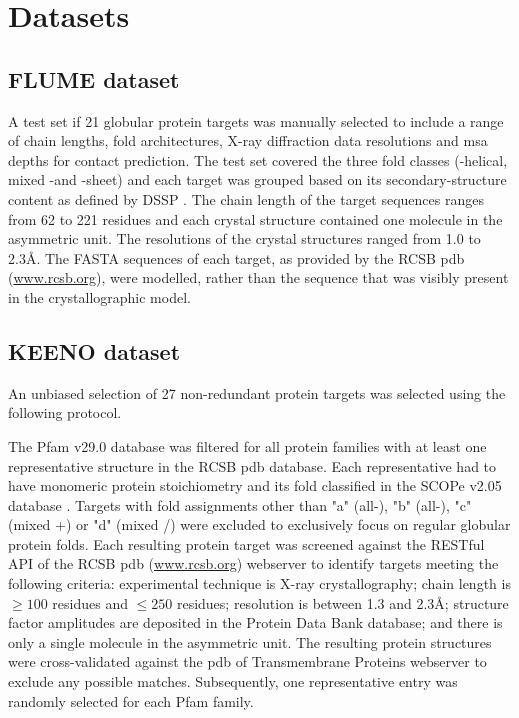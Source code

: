 
\section{Datasets}
\subsection{FLUME dataset}
A test set if 21 globular protein targets was manually selected to include a range of chain lengths, fold architectures, X-ray diffraction data resolutions and \gls{msa} depths for contact prediction. The test set covered the three fold classes (\textalpha-helical, mixed \textalpha-\textbeta and \textbeta-sheet) and each target was grouped based on its secondary-structure content as defined by DSSP \cite{Kabsch1983-dy}. The chain length of the target sequences ranges from 62 to 221 residues and each crystal structure contained one molecule in the asymmetric unit. The resolutions of the crystal structures ranged from 1.0 to 2.3\AA. The FASTA sequences of each target, as provided by the RCSB \gls{pdb} (\url{www.rcsb.org}), were modelled, rather than the sequence that was visibly present in the crystallographic model. 

\subsection{KEENO dataset} \label{sec:methods_keeno_dataset}
An unbiased selection of 27 non-redundant protein targets was selected using the following protocol.

The Pfam v29.0 \cite{Finn2016-tz} database was filtered for all protein families with at least one representative structure in the RCSB \gls{pdb} \cite{Berman2000-qj} database. Each representative had to have monomeric protein stoichiometry and its fold classified in the SCOPe v2.05 database \cite{Chandonia2017-bd}. Targets with fold assignments other than "a" (all-\textalpha), "b" (all-\textbeta), "c" (mixed \textalpha+\textbeta) or "d" (mixed \textalpha/\textbeta) were excluded to exclusively focus on regular globular protein folds. Each resulting protein target was screened against the RESTful API of the RCSB \gls{pdb} (\url{www.rcsb.org}) webserver to identify targets meeting the following criteria: experimental technique is X-ray crystallography; chain length is $\geq100$ residues and $\leq250$ residues; resolution is between 1.3 and 2.3\AA; structure factor amplitudes are deposited in the Protein Data Bank \cite{Berman2000-qj} database; and there is only a single molecule in the asymmetric unit. The resulting protein structures were cross-validated against the \acrlong{pdb} of Transmembrane Proteins \cite{Tusnady2005-lp} webserver to exclude any possible matches. Subsequently, one representative entry was randomly selected for each Pfam family.

